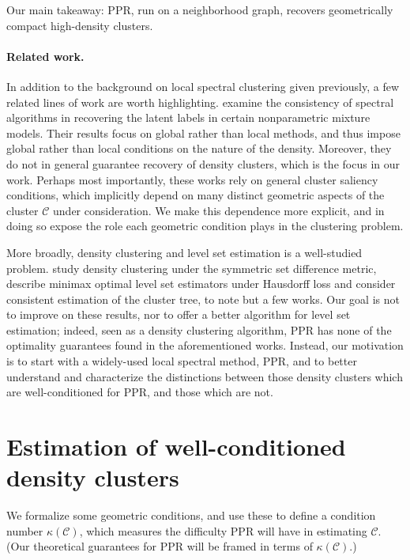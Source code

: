 \documentclass{article}
\newcommand{\1}{\mathbf{1}}
\newcommand{\Cset}{\mathcal{C}}
\theoremstyle{aldenthm}
\theoremstyle{aldenrmrk}
\begin{document}
Our main takeaway: PPR, run on a neighborhood graph, recovers geometrically
compact high-density clusters. 

\paragraph{Related work.} In addition to the background on local spectral
clustering given previously, a few related lines of work are worth
highlighting. \citep{shi2009,schiebinger2015} examine the consistency of  
spectral algorithms in recovering the latent labels in certain
nonparametric mixture models. Their results focus on global rather than local 
methods, and thus impose global rather than local conditions on the nature
of the density. Moreover, they do not in general guarantee recovery of density 
clusters, which is the focus in our work. Perhaps most importantly, these works
rely on general cluster saliency conditions, which implicitly depend on many
distinct geometric aspects of the cluster $\Cset$ under consideration. We make
this dependence more explicit, and in doing so expose the role each geometric
condition plays in the clustering problem. 

More broadly, density clustering and level set estimation is a well-studied
problem. \citet{polonik1995, rigollet2009} study density clustering under the 
symmetric set difference metric, \citet{tsybakov1997, singh2009} describe
minimax optimal level set estimators under Hausdorff loss and
\citet{hartigan1981, chaudhuri2010} consider consistent estimation of the
cluster tree, to note but a few works. Our goal is not to improve on these
results, nor to offer a better algorithm for level set estimation; indeed, seen as
a density clustering algorithm, PPR has none of the optimality guarantees 
found in the aforementioned works. Instead, our motivation is to start with a 
widely-used local spectral method, PPR, and to better understand and
characterize the distinctions between those density clusters which are
well-conditioned for PPR, and those which are not. 

\section{Estimation of well-conditioned density clusters}
\label{sec: consistent_cluster_estimation_with_ppr}

We formalize some geometric conditions, and use these to define a condition
number $\kappa(\Cset)$, which measures the difficulty PPR will have in  
estimating $\Cset$. (Our theoretical guarantees for PPR will be framed in terms 
of $\kappa(\Cset)$.)
\end{document}
